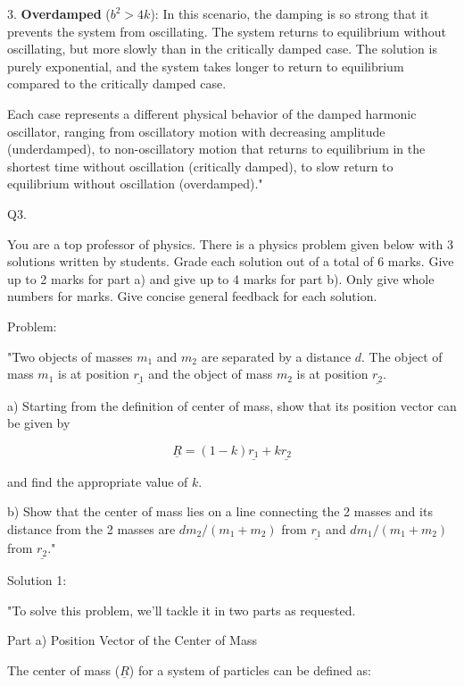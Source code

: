 3. \textbf{Overdamped} (\(b^2 > 4k\)): In this scenario, the damping is so strong that it prevents the system from oscillating. The system returns to equilibrium without oscillating, but more slowly than in the critically damped case. The solution is purely exponential, and the system takes longer to return to equilibrium compared to the critically damped case.

Each case represents a different physical behavior of the damped harmonic oscillator, ranging from oscillatory motion with decreasing amplitude (underdamped), to non-oscillatory motion that returns to equilibrium in the shortest time without oscillation (critically damped), to slow return to equilibrium without oscillation (overdamped)."



                           Q3. 

You are a top professor of physics. There is a physics problem given below with 3 solutions written by students. Grade each solution out of a total of 6 marks. Give up to 2 marks for part a) and give up to 4 marks for part b). Only give whole numbers for marks. Give concise general feedback for each solution.

Problem: 

"Two objects of masses \( m_{1} \) and \( m_{2} \) are separated by a distance \( d \). The object of mass \( m_{1} \) is at position \( \underline{r_{1}} \) and the object of mass \( m_{2} \) is at position \( \underline{r_{2}} \).

a) Starting from the definition of center of mass, show that its position vector can be given by 

\[ \underline{R} = (1-k)\underline{r_{1}} + k\underline{r_{2}} \]

and find the appropriate value of \( k \). 

b) Show that the center of mass lies on a line connecting the 2 masses and its distance from the 2 masses are \( d m_{2}/(m_{1}+m_{2}) \) from \( \underline{r_{1}} \) and \( d m_{1}/(m_{1}+m_{2}) \) from \( \underline{r_{2}} \)."

Solution 1:

"To solve this problem, we'll tackle it in two parts as requested.

Part a) Position Vector of the Center of Mass

The center of mass (\( \underline{R} \)) for a system of particles can be defined as:


